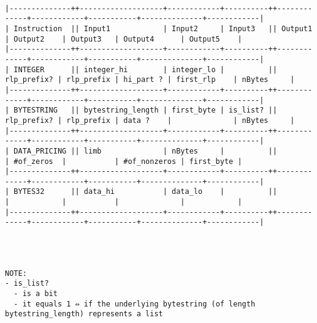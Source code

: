 \documentclass[varwidth=\maxdimen,margin=0.5cm,multi={verbatim}]{standalone}
\begin{document}
\begin{verbatim}

|--------------++-------------------+------------+----------++-------------+------------+-----------+--------------+------------|
| Instruction  || Input1            | Input2     | Input3   || Output1     | Output2    | Output3   | Output4      | Output5    |
|--------------++-------------------+------------+----------++-------------+------------+-----------+--------------+------------|
| INTEGER      || integer_hi        | integer_lo |          || rlp_prefix? | rlp_prefix | hi_part ? | first_rlp    | nBytes     |
|--------------++-------------------+------------+----------++-------------+------------+-----------+--------------+------------|
| BYTESTRING   || bytestring_length | first_byte | is_list? || rlp_prefix? | rlp_prefix | data ?    |              | nBytes     |
|--------------++-------------------+------------+----------++-------------+------------+-----------+--------------+------------|
| DATA_PRICING || limb              | nBytes     |          ||             | #of_zeros  |           | #of_nonzeros | first_byte |
|--------------++-------------------+------------+----------++-------------+------------+-----------+--------------+------------|
| BYTES32      || data_hi           | data_lo    |          ||             |            |           |              |            |
|--------------++-------------------+------------+----------++-------------+------------+-----------+--------------+------------|




NOTE:
- is_list?
  - is a bit
  - it equals 1 ⇔ if the underlying bytestring (of length bytestring_length) represents a list


\end{verbatim}
\end{document}
